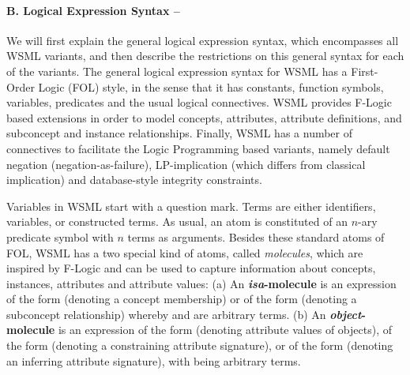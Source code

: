 \paragraph{B. Logical Expression Syntax --}
\label{sec:log-expr-syntax}

We will first explain the general logical expression syntax, which
encompasses all WSML variants, and then describe the restrictions on
this general syntax for each of the variants. The general logical
expression syntax for WSML has a First-Order Logic (FOL) style, in the
sense that it has constants, function symbols, variables, predicates
and the usual logical connectives. WSML provides F-Logic
\cite{Kifer+LausenETAL-LogiFounObjeFram:95} based extensions in
order to model concepts, attributes, attribute definitions, and
subconcept and instance relationships. Finally, WSML has a
number of connectives to facilitate the Logic Programming based
variants, namely default negation (negation-as-failure),
LP-implication (which differs from classical implication) and
database-style integrity constraints.

Variables in WSML start with a question mark.
Terms are either identifiers, variables, or constructed terms. As usual, an
atom is constituted of an $n$-ary predicate symbol with $n$ terms as
arguments. Besides these standard atoms of FOL, WSML has a two special kind of
atoms, called \emph{molecules}, which are inspired by F-Logic and can be used
to capture information about concepts, instances, attributes and attribute
values:
(a) An {\bfseries \emph{isa}-molecule} is an expression of
  the form  (denoting a concept membership)
  or of the form 
  (denoting a subconcept relationship)
  whereby  and  are arbitrary
  terms.
(b) An {\bfseries  \emph{object}-molecule} is an expression of the form
    (denoting attribute values of objects),
   of the form  (denoting a
  constraining attribute signature), or of the form
   (denoting an inferring attribute signature), with
   being arbitrary terms.

